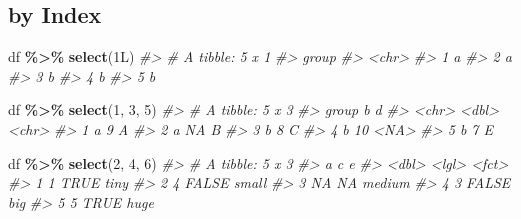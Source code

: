\documentclass[
]{report}
\newenvironment{Shaded}{\begin{snugshade}}{\end{snugshade}}
\newcommand{\CommentTok}[1]{\textcolor[rgb]{0.56,0.35,0.01}{\textit{#1}}}
\newcommand{\DecValTok}[1]{\textcolor[rgb]{0.00,0.00,0.81}{#1}}
\newcommand{\KeywordTok}[1]{\textcolor[rgb]{0.13,0.29,0.53}{\textbf{#1}}}
\newcommand{\NormalTok}[1]{#1}
\newcommand{\OperatorTok}[1]{\textcolor[rgb]{0.81,0.36,0.00}{\textbf{#1}}}
\newcommand{\StringTok}[1]{\textcolor[rgb]{0.31,0.60,0.02}{#1}}
\begin{document}
\hypertarget{by-index}{%
\subsection{by Index}\label{by-index}}

\begin{Shaded}
\begin{Highlighting}[]
\NormalTok{df }\OperatorTok{\%\textgreater{}\%}
\StringTok{  }\KeywordTok{select}\NormalTok{(1L)}
\CommentTok{\#\textgreater{} \# A tibble: 5 x 1}
\CommentTok{\#\textgreater{}   group}
\CommentTok{\#\textgreater{}   \textless{}chr\textgreater{}}
\CommentTok{\#\textgreater{} 1 a    }
\CommentTok{\#\textgreater{} 2 a    }
\CommentTok{\#\textgreater{} 3 b    }
\CommentTok{\#\textgreater{} 4 b    }
\CommentTok{\#\textgreater{} 5 b}
\end{Highlighting}
\end{Shaded}

\begin{Shaded}
\begin{Highlighting}[]
\NormalTok{df }\OperatorTok{\%\textgreater{}\%}
\StringTok{  }\KeywordTok{select}\NormalTok{(}\DecValTok{1}\NormalTok{, }\DecValTok{3}\NormalTok{, }\DecValTok{5}\NormalTok{)}
\CommentTok{\#\textgreater{} \# A tibble: 5 x 3}
\CommentTok{\#\textgreater{}   group     b d    }
\CommentTok{\#\textgreater{}   \textless{}chr\textgreater{} \textless{}dbl\textgreater{} \textless{}chr\textgreater{}}
\CommentTok{\#\textgreater{} 1 a         9 A    }
\CommentTok{\#\textgreater{} 2 a        NA B    }
\CommentTok{\#\textgreater{} 3 b         8 C    }
\CommentTok{\#\textgreater{} 4 b        10 \textless{}NA\textgreater{} }
\CommentTok{\#\textgreater{} 5 b         7 E}
\end{Highlighting}
\end{Shaded}

\begin{Shaded}
\begin{Highlighting}[]
\NormalTok{df }\OperatorTok{\%\textgreater{}\%}
\StringTok{  }\KeywordTok{select}\NormalTok{(}\DecValTok{2}\NormalTok{, }\DecValTok{4}\NormalTok{, }\DecValTok{6}\NormalTok{)}
\CommentTok{\#\textgreater{} \# A tibble: 5 x 3}
\CommentTok{\#\textgreater{}       a c     e     }
\CommentTok{\#\textgreater{}   \textless{}dbl\textgreater{} \textless{}lgl\textgreater{} \textless{}fct\textgreater{} }
\CommentTok{\#\textgreater{} 1     1 TRUE  tiny  }
\CommentTok{\#\textgreater{} 2     4 FALSE small }
\CommentTok{\#\textgreater{} 3    NA NA    medium}
\CommentTok{\#\textgreater{} 4     3 FALSE big   }
\CommentTok{\#\textgreater{} 5     5 TRUE  huge}
\end{Highlighting}
\end{Shaded}
\end{document}
